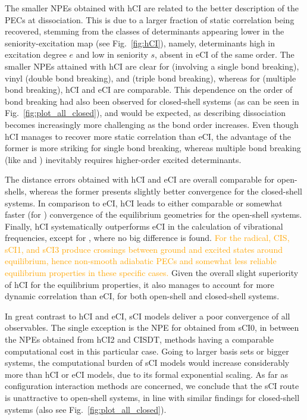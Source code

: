 \documentclass[aip,jcp,reprint,noshowkeys,superscriptaddress]{revtex4-1}
\newcommand{\fk}[1]{\textcolor{orange}{#1}}
\begin{document}
The smaller NPEs obtained with hCI are related to the better description of the PECs at dissociation.
This is due to a larger fraction of static correlation being recovered,
stemming from the classes of determinants appearing lower in the seniority-excitation map (see Fig.~\ref{fig:hCI}),
namely, determinants high in excitation degree $e$ and low in seniority $s$, absent in eCI of the same order.
The smaller NPEs attained with hCI are clear for  (involving a single bond breaking),
vinyl (double bond breaking), and  (triple bond breaking),
whereas for  (multiple bond breaking), hCI and eCI are comparable.
This dependence on the order of bond breaking had also been observed for closed-shell systems \cite{Kossoski_2022} (as can be seen in Fig.~\ref{fig:plot_all_closed}),
and would be expected, as describing dissociation becomes increasingly more challenging as the bond order increases.
Even though hCI manages to recover more static correlation than eCI,
the advantage of the former is more striking for single bond breaking, whereas multiple bond breaking (like  and ) inevitably requires higher-order excited determinants.

The distance errors obtained with hCI and eCI are overall comparable for open-shells, whereas the former presents slightly better convergence for the closed-shell systems.
In comparison to eCI, hCI leads to either comparable or somewhat faster (for ) convergence of the equilibrium geometries for the open-shell systems.
Finally, hCI systematically outperforms eCI in the calculation of vibrational frequencies, except for , where no big difference is found.
\fk{For the  radical, CIS, sCI1, and sCI3 produce crossings between ground and excited states around equilibrium, hence non-smooth adiabatic PECs
and somewhat less reliable equilibrium properties in these specific cases.}
Given the overall slight superiority of hCI for the equilibrium properties, it also manages to account for more dynamic correlation than eCI,
for both open-shell and closed-shell systems.

In great contrast to hCI and eCI, sCI models deliver a poor convergence of all observables.
The single exception is the NPE for  obtained from sCI0, in between the NPEs obtained from hCI2 and CISDT, methods having a comparable computational cost in this particular case.
Going to larger basis sets or bigger systems, the computational burden of sCI models would increase considerably more than hCI or eCI models,
due to its formal exponential scaling.
As far as configuration interaction methods are concerned, we conclude that the sCI route is unattractive to open-shell systems,
in line with similar findings for closed-shell systems \cite{Kossoski_2022} (also see Fig.~\ref{fig:plot_all_closed}).
\end{document}
